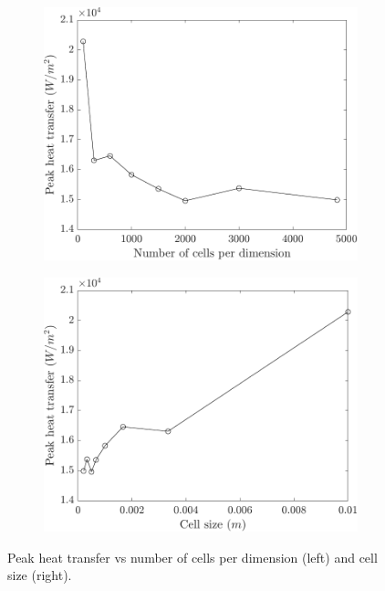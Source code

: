 \begin{figure}
    \centering
    \begin{subfigure}{0.49\textwidth}
        \centering
        \includegraphics[width=\textwidth]{Images/3. Methodology/Mesh convergence/phnc.pdf}
    \end{subfigure}
    \hfill
    \begin{subfigure}{0.49\textwidth}
        \centering
        \includegraphics[width=\textwidth]{Images/3. Methodology/Mesh convergence/phcs.pdf}
    \end{subfigure}
    \caption{Peak heat transfer vs number of cells per dimension (left) and cell size (right).}
    \label{fig:meshpeak}
\end{figure}

